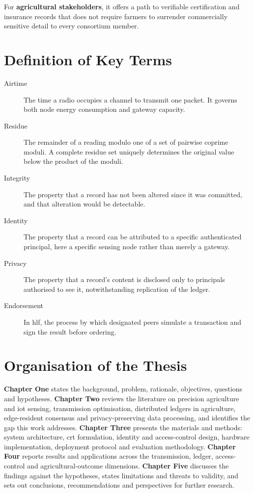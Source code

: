 \documentclass[12pt,a4paper,oneside]{book}
\begin{document}
For \textbf{agricultural stakeholders}, it offers a path to verifiable
certification and insurance records that does not require farmers to surrender
commercially sensitive detail to every consortium member.

\section{Definition of Key Terms}
\label{sec:definitions}

\begin{description}
  \item[Airtime] The time a radio occupies a channel to transmit one packet. It
        governs both node energy consumption and gateway capacity.

  \item[Residue] The remainder of a reading modulo one of a set of pairwise
        coprime moduli. A complete residue set uniquely determines the original
        value below the product of the moduli.

  \item[Integrity] The property that a record has not been altered since it was
        committed, and that alteration would be detectable.

  \item[Identity] The property that a record can be attributed to a specific
        authenticated principal, here a specific sensing node rather than
        merely a gateway.

  \item[Privacy] The property that a record's content is disclosed only to
        principals authorised to see it, notwithstanding replication of the
        ledger.

  \item[Endorsement] In \gls{hlf}, the process by which designated peers
        simulate a transaction and sign the result before ordering.
\end{description}

\section{Organisation of the Thesis}
\label{sec:organisation}

\textbf{Chapter One} states the background, problem, rationale, objectives,
questions and hypotheses. \textbf{Chapter Two} reviews the literature on
precision agriculture and \gls{iot} sensing, transmission optimisation,
distributed ledgers in agriculture, edge-resident consensus and
privacy-preserving data processing, and identifies the gap this work addresses.
\textbf{Chapter Three} presents the materials and methods: system architecture,
\gls{crt} formulation, identity and access-control design, hardware
implementation, deployment protocol and evaluation methodology.
\textbf{Chapter Four} reports results and applications across the transmission,
ledger, access-control and agricultural-outcome dimensions. \textbf{Chapter
Five} discusses the findings against the hypotheses, states limitations and
threats to validity, and sets out conclusions, recommendations and perspectives
for further research.
\clearpage{}
\clearpage{}
\end{document}
